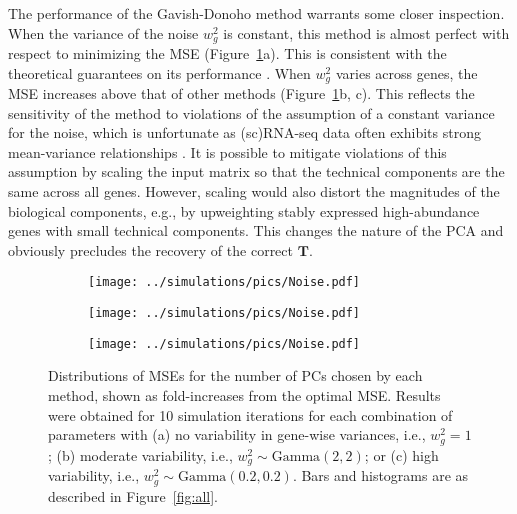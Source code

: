 \documentclass[10pt,letterpaper]{article}
\begin{document}
The performance of the Gavish-Donoho method warrants some closer inspection.
When the variance of the noise $w^2_g$ is constant, this method is almost perfect with respect to minimizing the MSE (Figure~\ref{fig:noise}a).
This is consistent with the theoretical guarantees on its performance \cite{gavish2014optimal}.
When $w^2_g$ varies across genes, the MSE increases above that of other methods (Figure~\ref{fig:noise}b, c).
This reflects the sensitivity of the method to violations of the assumption of a constant variance for the noise,
which is unfortunate as (sc)RNA-seq data often exhibits strong mean-variance relationships \cite{lun2016stepbystep,law2014voom}. 
It is possible to mitigate violations of this assumption by scaling the input matrix so that the technical components are the same across all genes.
However, scaling would also distort the magnitudes of the biological components, e.g., by upweighting stably expressed high-abundance genes with small technical components.
This changes the nature of the PCA and obviously precludes the recovery of the correct $\mathbf{T}$.

\begin{figure}
\begin{subfigure}[b]{0.49\textwidth}
    \texttt{[image: ../simulations/pics/Noise.pdf]}
    \caption{}
\end{subfigure}
\begin{subfigure}[b]{0.49\textwidth}
    \texttt{[image: ../simulations/pics/Noise.pdf]}
    \caption{}
\end{subfigure}
\begin{subfigure}[b]{0.49\textwidth}
    \texttt{[image: ../simulations/pics/Noise.pdf]}
    \caption{}
\end{subfigure}
\caption{Distributions of MSEs for the number of PCs chosen by each method, shown as fold-increases from the optimal MSE.
Results were obtained for 10 simulation iterations for each combination of parameters with 
(a) no variability in gene-wise variances, i.e., $w_g^2=1$;
(b) moderate variability, i.e., $w_g^2 \sim \mbox{Gamma}(2, 2)$;
or (c) high variability, i.e., $w_g^2 \sim \mbox{Gamma}(0.2, 0.2)$.
Bars and histograms are as described in Figure~\ref{fig:all}.    
}
\label{fig:noise}
\end{figure}
\end{document}

